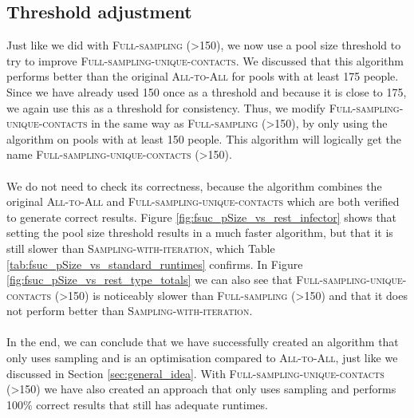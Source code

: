 \subsection{Threshold adjustment}
\label{subsec:threshold_adjustment}
Just like we did with \textsc{Full-sampling (>150)}, we now use a pool size threshold to try to improve \textsc{Full-sampling-unique-contacts}. We discussed that this algorithm performs better than the original \textsc{All-to-All} for pools with at least 175 people. Since we have already used 150 once as a threshold and because it is close to 175, we again use this as a threshold for consistency. Thus, we modify \textsc{Full-sampling-unique-contacts} in the same way as \textsc{Full-sampling (>150)}, by only using the algorithm on pools with at least 150 people. This algorithm will logically get the name \textsc{Full-sampling-unique-contacts (>150)}.
\\\\
We do not need to check its correctness, because the algorithm combines the original \textsc{All-to-All} and \textsc{Full-sampling-unique-contacts} which are both verified to generate correct results. Figure \ref{fig:fsuc_pSize_vs_rest_infector} shows that setting the pool size threshold results in a much faster algorithm, but that it is still slower than \textsc{Sampling-with-iteration}, which Table \ref{tab:fsuc_pSize_vs_standard_runtimes} confirms. In Figure \ref{fig:fsuc_pSize_vs_rest_type_totals} we can also see that \textsc{Full-sampling-unique-contacts (>150)} is noticeably slower than \textsc{Full-sampling (>150)} and that it does not perform better than \textsc{Sampling-with-iteration}.
\\\\
In the end, we can conclude that we have successfully created an algorithm that only uses sampling and is an optimisation compared to \textsc{All-to-All}, just like we discussed in Section \ref{sec:general_idea}. With \textsc{Full-sampling-unique-contacts (>150)} we have also created an approach that only uses sampling and performs 100\% correct results that still has adequate runtimes.

